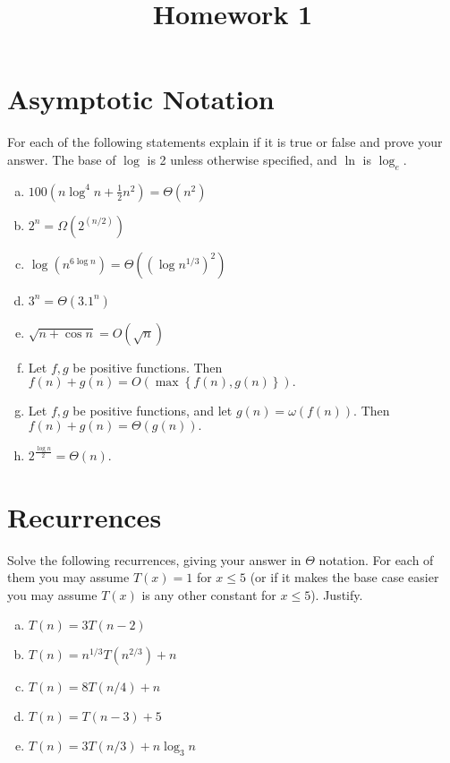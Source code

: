 \documentclass{article}
\begin{document}
\title{Homework 1}
\maketitle
\thispagestyle{fancy}

\section{Asymptotic Notation}

For each of the following statements explain if it is true or false and prove your answer. The base of $\log$ is 2 unless otherwise specified, and $\ln$ is $\log_e.$

\begin{enumerate}[(a)]
	\item $100(n\log^4 n+\frac{1}{2}n^2)=\Theta(n^2)$

	\item $2^n=\Omega(2^{(n/2)})$

	\item $\log(n^{6\log n})=\Theta\left( \left( \log n^{1/3} \right)^2 \right)$

	\item $3^n=\Theta\left( 3.1^n \right)$

	\item $\sqrt{n+\cos n} = O(\sqrt{n})$

	\item Let $f, g$ be positive functions. Then $f(n)+g(n)=O(\max\left\{ f(n), g(n) \right\}).$

	\item Let $f, g$ be positive functions, and let $g(n)=\omega(f(n)).$ Then $f(n)+g(n)=\Theta(g(n)).$

	\item $2^{\frac{\log n}{2}} = \Theta(n).$

\end{enumerate}

\section{Recurrences}

Solve the following recurrences, giving your answer in $\Theta$ notation. For each of them you may assume $T(x)=1$ for $x\le 5$ (or if it makes the base case easier you may assume $T(x)$ is any other constant for $x\le 5$). Justify.

\begin{enumerate}[(a)]
	\item $T(n)=3T(n-2)$

	\item $T(n)=n^{1/3} T(n^{2/3}) + n$

	\item $T(n)=8T(n/4) + n$

	\item $T(n) = T(n-3) + 5$

	\item $T(n)= 3T(n/3) + n\log_3 n$
		
\end{enumerate}
\end{document}
